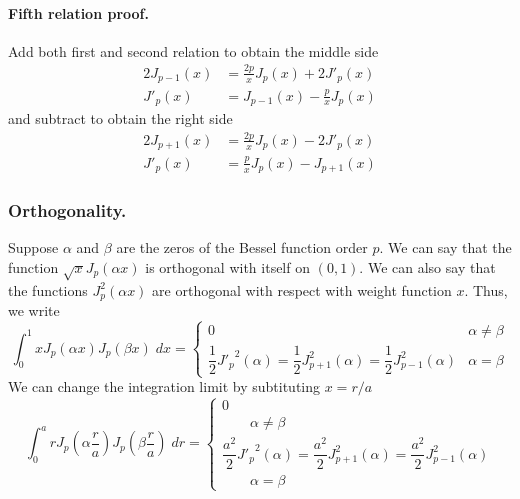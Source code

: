 \documentclass[../main.tex]{subfiles}
\begin{document}
\paragraph*{Fifth relation proof.} Add both first and second relation to obtain the middle side 
\begin{align*}
    2J_{p-1}(x)&=\frac{2p}{x}J_p(x)+2J'_p(x)\\
    J'_{p}(x)&=J_{p-1}(x)-\frac{p}{x}J_p(x)
\end{align*}
and subtract to obtain the right side
\begin{align*}
    2J_{p+1}(x)&=\frac{2p}{x}J_p(x)-2J'_p(x)\\
    J'_{p}(x)&=\frac{p}{x}J_p(x)-J_{p+1}(x)
\end{align*}

\subsubsection*{Orthogonality.} Suppose $\alpha$ and $\beta$ are the zeros of the Bessel function order $p$. We can say that the function $\sqrt{x}J_p(\alpha x)$ is orthogonal with itself on $(0,1)$. We can also say that the functions $J_p^2(\alpha x)$ are orthogonal with respect with weight function $x$. Thus, we write
\begin{equation*}
    \int_{0}^{1}xJ_p(\alpha x)J_p(\beta x)\;dx=\begin{cases}
        0&\alpha\neq \beta\\
        \dfrac{1}{2}{J'_p}^2(\alpha)=\dfrac{1}{2}J_{p+1}^2(\alpha) =\dfrac{1}{2}J_{p-1}^2(\alpha)&\alpha=\beta
    \end{cases}
\end{equation*}
We can change the integration limit by subtituting $x=r/a$
\begin{equation*}
    \int_{0}^{a}rJ_p\left(\alpha \frac{r}{a}\right)J_p\left(\beta \frac{r}{a}\right)\;dr=\begin{cases}
        0\\
        \qquad \alpha\neq \beta\\
        \dfrac{a^2}{2}{J'_p}^2(\alpha)=\dfrac{a^2}{2}J_{p+1}^2(\alpha) =\dfrac{a^2}{2}J_{p-1}^2(\alpha)\\
        \qquad\alpha=\beta
    \end{cases}
\end{equation*}
\end{document}
